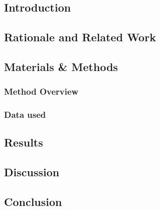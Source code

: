 \subsection{Introduction}

\subsection{Rationale and Related Work}

\subsection{Materials \& Methods}
\subsubsection{Method Overview}

\subsubsection{Data used}

\subsection{Results}

\subsection{Discussion}

\subsection{Conclusion}





